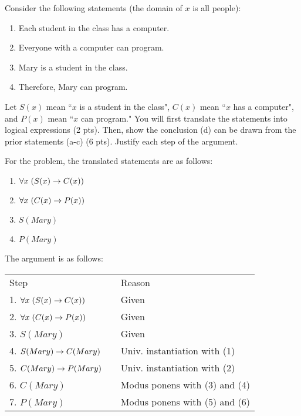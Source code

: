 \begin{questions}
 Consider the following statements (the domain of $x$ is all people):
  \begin{enumerate}[label=(\alph*),itemsep=0pt,parsep=0pt,
      topsep=0pt,partopsep=0pt]
      \item Each student in the class has a computer.
      \item Everyone with a computer can program.
      \item Mary is a student in the class.
      \item Therefore, Mary can program.
    \end{enumerate}
Let $S(x)$ mean ``$x$ is a student in the class", $C(x)$ mean ``$x$ has a computer", and $P(x)$ mean ``$x$ can program."  You will first translate the statements into logical expressions (2 pts).  Then, show the conclusion (d) can be drawn from the prior statements (a-c) (6 pts).  Justify each step of the argument.
  \ifprintanswers
        \vspace{-10pt}
    \fi
\begin{solution}
    For the problem, the translated statements are as follows:
  \begin{enumerate}[label=(\alph*),itemsep=0pt,parsep=0pt,
      topsep=0pt,partopsep=0pt]
      \item $\forall x\; (S(x) \rightarrow C(x))$
      \item $\forall x\; (C(x) \rightarrow P(x))$
      \item $S(Mary)$
      \item $P(Mary)$
    \end{enumerate}
    
    The argument is as follows:
    
    \begin{tabular}{lll}
            Step                    & \hspace{0.15in} & Reason \\
            1. $\forall x\; (S(x) \rightarrow C(x))$      & & Given \\
            2. $\forall x\; (C(x) \rightarrow P(x))$      & & Given \\
            3. $S(Mary)$                & & Given \\
            4. $S(Mary) \rightarrow C(Mary)$            & & Univ. instantiation with (1) \\
            5. $C(Mary) \rightarrow P(Mary)$                    & & Univ. instantiation with (2) \\
            6. $C(Mary)$                        & & Modus ponens with (3) and (4) \\
            7. $P(Mary)$                        & & Modus ponens with (5) and (6) \\
    \end{tabular}
\end{solution}




\end{questions}
